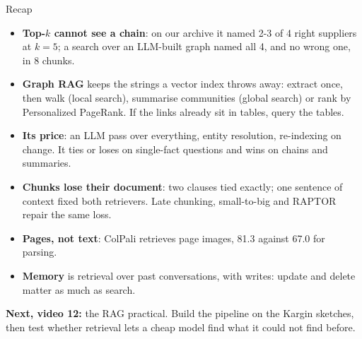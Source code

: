 \documentclass[aspectratio=169]{beamer}
\newcommand{\takebox}[1]{%
  \begin{tcolorbox}[colback=paramgreen!8, colframe=paramgreen, boxrule=0.6pt, arc=2pt]
  #1
  \end{tcolorbox}}
\begin{document}
\begin{frame}{Recap}
  \footnotesize
  \begin{itemize}\setlength{\itemsep}{1pt}
    \item \textbf{Top-$k$ cannot see a chain}: on our archive it named 2-3 of 4 right suppliers at
      $k = 5$; a search over an LLM-built graph named all 4, and no wrong one, in 8 chunks.
    \item \textbf{Graph RAG} keeps the strings a vector index throws away: extract once, then walk
      (local search), summarise communities (global search) or rank by Personalized PageRank. If
      the links already sit in tables, query the tables.
    \item \textbf{Its price}: an LLM pass over everything, entity resolution, re-indexing on change.
      It ties or loses on single-fact questions and wins on chains and summaries.
    \item \textbf{Chunks lose their document}: two clauses tied exactly; one sentence of context
      fixed both retrievers. Late chunking, small-to-big and RAPTOR repair the same loss.
    \item \textbf{Pages, not text}: ColPali retrieves page images, 81.3 against 67.0 for parsing.
    \item \textbf{Memory} is retrieval over past conversations, with writes: update and delete
      matter as much as search.
  \end{itemize}

  \vspace{0.2em}
  \takebox{\small \textbf{Next, video 12:} the RAG practical. Build the pipeline on the Kargin sketches, then
  test whether retrieval lets a cheap model find what it could not find before.}
\end{frame}
\end{document}
